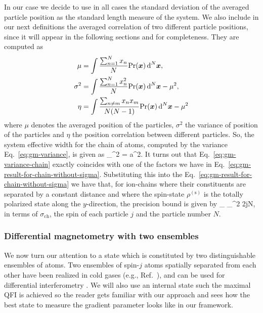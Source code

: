 In our case we decide to use in all cases the standard deviation of the averaged particle position as the standard length measure of the system.
We also include in our next definitions the averaged correlation of two different particle positions, since it will appear in the following sections and for completeness.
They are computed as
\begin{align}
  \mu &= \int \frac{\sum_{n=1}^N x_n}{N} \text{Pr}(\boldsymbol{x}) \, \text{d}^N\boldsymbol{x},
  \label{eq:gm-mean} \\
  \sigma^2 &= \int \frac{\sum_{n=1}^N x_n^2}{N} \text{Pr}(\boldsymbol{x}) \, \text{d}^N\boldsymbol{x}  - \mu^2,
  \label{eq:gm-variance} \\
  \eta & =  \int \frac{\sum_{n\neq m} x_n x_m}{N(N-1)}\text{Pr}(\boldsymbol{x}) \, \text{d}^N\boldsymbol{x} - \mu^2
  \label{eq:gm-correlation}
\end{align}
where $\mu$ denotes the averaged position of the particles, $\sigma^2$ the variance of position of the particles and $\eta$ the position correlation between different particles.
So, the system effective width for the chain of atoms, computed by the variance Eq.~\eqref{eq:gm-variance}, is given as
\be
  \sigma_{}^2 = a^2.
  \label{eq:gm-variance-chain}
\ee
It turns out that Eq.~\eqref{eq:gm-variance-chain} exactly coincides with one of the factors we have in Eq.~\eqref{eq:gm-result-for-chain-without-sigma}.
Substituting this into the Eq.~\eqref{eq:gm-result-for-chain-without-sigma} we have that,
for ion-chains where their constituents are separated by a constant distance and where the spin-state $\rho^{(\text{s})}$ is the totally polarized state along the $y$-direction, the precision bound is given by
\be
  _{} \leqslant \sigma_{}^2 2jN,
\ee
in terms of $\sigma_{\text{ch}}$, the spin of each particle $j$ and the particle number $N$.

\subsubsection{Differential magnetometry with two ensembles}

We now turn our attention to a state which is constituted by two distinguishable ensembles of atoms.
Two ensembles of spin-$j$ atoms spatially separated from each other have been realized in cold gases (e.g., Ref.~\cite{Julsgaard2001}), and can be used for differential interferometry \cite{Eckert2006, Landini2014}.
We will also use an internal state such the maximal QFI is achieved so the reader gets familiar with our approach and sees how the best state to measure the gradient parameter looks like in our framework.

